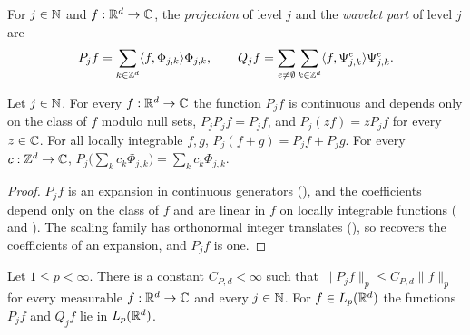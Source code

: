 \begin{definition}
\label{def:daub-rd-proj}
\leanok
{}
For $j \in \mathbb{N}$ and $f : \mathbb{R}^d \to \mathbb{C}$, the \emph{projection} of level $j$ and the
\emph{wavelet part} of level $j$ are
\[
  P_j f = \sum_{k \in \mathbb{Z}^d} \langle f, \Phi_{j,k} \rangle \Phi_{j,k} , \qquad
  Q_j f = \sum_{e \neq \emptyset} \sum_{k \in \mathbb{Z}^d}
    \langle f, \Psi^e_{j,k} \rangle \Psi^e_{j,k} .
\]
\end{definition}

\begin{lemma}
\label{lem:daub-rd-proj-basic}
\leanok
{}
Let $j \in \mathbb{N}$. For every $f : \mathbb{R}^d \to \mathbb{C}$ the function $P_j f$ is continuous and depends only
on the class of $f$ modulo null sets, $P_j P_j f = P_j f$, and $P_j (z f) = z P_j f$ for every
$z \in \mathbb{C}$. For all locally integrable $f, g$, $P_j (f + g) = P_j f + P_j g$. For every
$c : \mathbb{Z}^d \to \mathbb{C}$,
$P_j \bigl(\sum_k c_k \Phi_{j,k}\bigr) = \sum_k c_k \Phi_{j,k}$.
\end{lemma}

\begin{proof}
\leanok
{}
$P_j f$ is an expansion in continuous generators (), and the
coefficients depend only on the class of $f$ and are linear in $f$ on locally integrable
functions ( and ). The scaling
family has orthonormal integer translates (), so
 recovers the coefficients of an expansion, and $P_j f$ is one.
\end{proof}

\begin{theorem}
\label{thm:daub-rd-proj-bound}
\leanok
{}
Let $1 \leq p < \infty$. There is a constant $C_{P,d} < \infty$ such that
$\|P_j f\|_p \leq C_{P,d} \|f\|_p$ for every measurable $f : \mathbb{R}^d \to \mathbb{C}$ and every $j \in \mathbb{N}$.
For $f \in L_p(\mathbb{R}^d)$ the functions $P_j f$ and $Q_j f$ lie in $L_p(\mathbb{R}^d)$.
\end{theorem}

